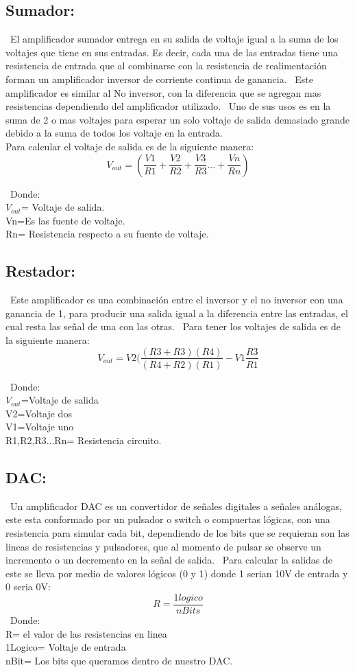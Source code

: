 \documentclass[14pt,letterpaper]{article}
\begin{document}
\subsection{Sumador:}
\
El amplificador sumador entrega en su salida de voltaje igual a la suma de los voltajes que tiene en sus entradas. Es decir, cada una de las entradas tiene una resistencia de entrada que al combinarse con la resistencia de realimentación forman un amplificador inversor de corriente continua de ganancia.
\
Este amplificador es similar al No inversor, con la diferencia que se agregan mas resistencias dependiendo del amplificador utilizado.
\
Uno de sus usos es en la suma de 2 o mas voltajes para esperar un solo voltaje de salida  demasiado grande debido a la suma de todos los voltaje en la entrada.\\ Para calcular el voltaje de salida es de la siguiente manera:
$$V_{out}=(\frac{V1}{R1}+\frac{V2}{R2}+\frac{V3}{R3}...+\frac{Vn}{Rn})$$

\
Donde:\\$V_{out}$= Voltaje de salida.
\\Vn=Es las fuente de voltaje.
\\Rn= Resistencia respecto a su fuente de voltaje.

\subsection{Restador:}
\
Este amplificador es una combinación entre el inversor y el no inversor con una ganancia de 1, para producir una salida igual a la diferencia entre las entradas, el cual resta las señal de una con las otras.
\
Para tener los voltajes de salida es de la siguiente manera:
$$V_{out}=V2(\frac{(R3+R3)(R4)}{(R4+R2)(R1)}-V1\frac{R3}{R1}$$

\
Donde:
\\$V_{out}$=Voltaje de salida
\\V2=Voltaje dos
\\V1=Voltaje uno
\\R1,R2,R3...Rn= Resistencia circuito.
\subsection{DAC:}
\
Un amplificador DAC es un convertidor de señales digitales a señales análogas, este esta conformado por un pulsador o switch o compuertas lógicas, con una resistencia para simular cada bit, dependiendo de los bits que se requieran son las lineas de resistencias y pulsadores, que al momento de pulsar se observe un incremento o un decremento en la señal de salida.
\
Para calcular la salidas de este se lleva por medio de valores lógicos (0 y 1) donde 1 serian 10V de entrada y 0 seria 0V:
$$R=\frac{1logico}{nBits}$$
\
Donde:
\\R= el valor de las resistencias en linea
\\1Logico= Voltaje de entrada
\\nBit= Los bits que queramos dentro de nuestro DAC.
\end{document}

